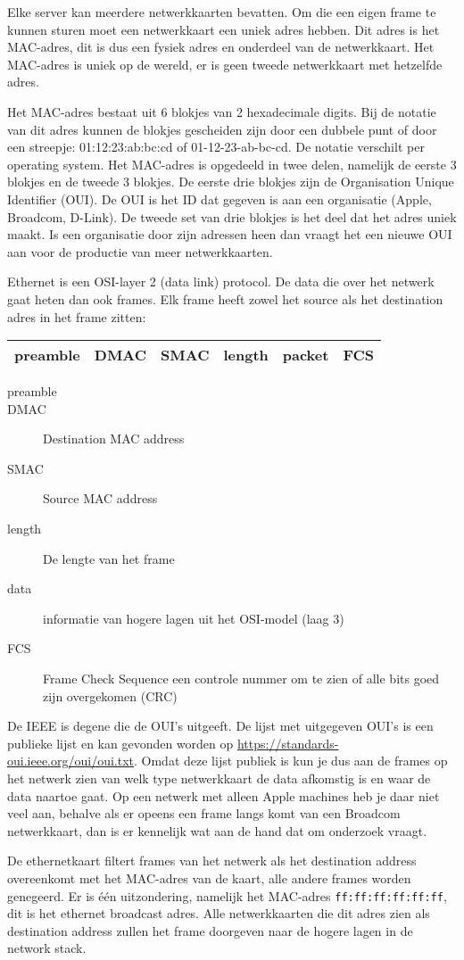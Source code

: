 Elke server kan meerdere netwerkkaarten bevatten. Om die een eigen frame te kunnen sturen moet een netwerkkaart een uniek adres hebben. Dit adres is het MAC-adres, dit is dus een fysiek adres en onderdeel van de netwerkkaart. Het MAC-adres is uniek op de wereld, er is geen tweede netwerkkaart met hetzelfde adres.

Het MAC-adres bestaat uit 6 blokjes van 2 hexadecimale digits. Bij de notatie van dit adres kunnen de blokjes gescheiden zijn door een dubbele punt of door een streepje: 01:12:23:ab:bc:cd of 01-12-23-ab-bc-cd. De notatie verschilt per operating system. Het MAC-adres is opgedeeld in twee delen, namelijk de eerste 3 blokjes en de tweede 3 blokjes. De eerste drie blokjes zijn de Organisation Unique Identifier (OUI). De OUI is het ID dat gegeven is aan een organisatie (Apple, Broadcom, D-Link). De tweede set van drie blokjes is het deel dat het adres uniek maakt. Is een organisatie door zijn adressen heen dan vraagt het een nieuwe OUI aan voor de productie van meer netwerkkaarten.

Ethernet is een OSI-layer 2 (data link) protocol. De data die over het netwerk gaat heten dan ook frames. Elk frame heeft zowel het source als het destination adres in het frame zitten:

\begin{tabular}{ |c|c|c|c|c|c| }
\hline
	preamble & DMAC & SMAC & length & packet & FCS \\
\hline
\end{tabular}

\begin{description}
	\item[preamble]
	\item[DMAC] Destination MAC address
	\item[SMAC] Source MAC address
	\item[length] De lengte van het frame
	\item[data] informatie van hogere lagen uit het OSI-model (laag 3)
	\item[FCS] Frame Check Sequence een controle nummer om te zien of alle bits goed zijn overgekomen (CRC)
\end{description}


De IEEE is degene die de OUI's uitgeeft. De lijst met uitgegeven OUI's is een publieke lijst en kan gevonden worden op \url{https://standards-oui.ieee.org/oui/oui.txt}. Omdat deze lijst publiek is kun je dus aan de frames op het netwerk zien van welk type netwerkkaart de data afkomstig is en waar de data naartoe gaat. Op een netwerk met alleen Apple machines heb je daar niet veel aan, behalve als er opeens een frame langs komt van een Broadcom netwerkkaart, dan is er kennelijk wat aan de hand dat om onderzoek vraagt.

De ethernetkaart filtert frames van het netwerk als het destination address overeenkomt met het MAC-adres van de kaart, alle andere frames worden genegeerd. Er is \'e\'en uitzondering, namelijk het MAC-adres \newline\texttt{ff:ff:ff:ff:ff:ff}, dit is het ethernet broadcast adres. Alle netwerkkaarten die dit adres zien als destination address zullen het frame doorgeven naar de hogere lagen in de network stack.
